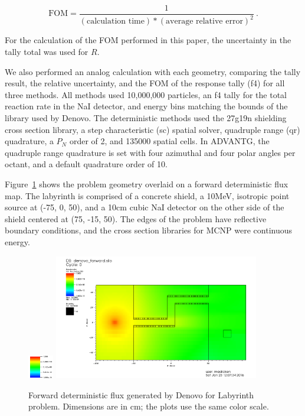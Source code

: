 \documentclass[12pt]{article}
\begin{document}
\[\text{FOM} = \frac{1}{(\text{calculation time})*(\text{average relative error})^2}\:. \]

For the calculation of the FOM performed in this paper, the uncertainty in the tally total was used for $R$. 

We also performed an analog calculation with each geometry, comparing  the tally result, the relative uncertainty, and the FOM of the response tally (f4) for all three methods.
All methods used 10,000,000 particles, an f4 tally for the total reaction rate in the NaI detector, and energy bins matching the bounds of the library used by Denovo. 
The deterministic methods used the 27g19n shielding cross section library, a step characteristic (sc) spatial solver, quadruple range (qr) quadrature, a $P_N$ order of 2, and 135000 spatial cells. In ADVANTG, the quadruple range quadrature is set with four azimuthal and four polar angles per octant, and a default quadrature order of 10. 

Figure~\ref{fig::fwdflux} shows the problem geometry overlaid on a forward deterministic flux map. The labyrinth is comprised of a concrete shield, a 10MeV, isotropic point source at (-75, 0, 50), and a 10cm cubic NaI detector on the other side of the shield centered at (75, -15, 50). The edges of the problem have reflective boundary conditions, and the cross section libraries for MCNP were continuous energy. 

\begin{figure}
  \begin{center}
    \includegraphics[width=0.10\textwidth]{./images/scale.png}
    \includegraphics[width=0.80\textwidth]{./images/maze2_forward_group00_adjusted.png}
    \caption[]{\label{fig::fwdflux}Forward deterministic flux generated by Denovo for Labyrinth problem. Dimensions are in cm; the plots use the same color scale.}
  \end{center}
\end{figure}
\end{document}
